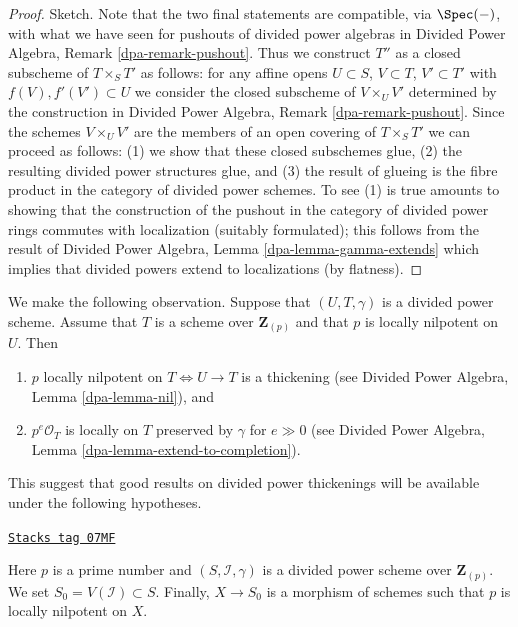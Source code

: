 \begin{proof}
Sketch. Note that the two final statements are compatible, via $\Spec(-)$,
with what we have seen for pushouts of divided power algebras in
Divided Power Algebra, Remark \ref{dpa-remark-pushout}.
Thus we construct $T''$ as a closed subscheme of $T \times_S T'$
as follows: for any affine opens $U \subset S$, $V \subset T$,
$V' \subset T'$ with $f(V), f'(V') \subset U$ we consider the closed
subscheme of $V \times_U V'$ determined by the construction in
Divided Power Algebra, Remark \ref{dpa-remark-pushout}. Since the
schemes $V \times_U V'$ are the members of an open covering
of $T \times_S T'$ we can proceed as follows: (1) we show that these
closed subschemes glue, (2) the resulting
divided power structures glue, and (3) the result of glueing
is the fibre product in the category of divided power schemes.
To see (1) is true amounts to showing
that the construction of the pushout in the category of
divided power rings commutes with localization (suitably
formulated); this follows from the result of
Divided Power Algebra, Lemma \ref{dpa-lemma-gamma-extends} which implies
that divided powers extend to localizations (by flatness).
\end{proof}

We make the following observation. Suppose that $(U, T, \gamma)$
is a divided power scheme. Assume that $T$ is a scheme over $\mathbf{Z}_{(p)}$
and that $p$ is locally nilpotent on $U$. Then
\begin{enumerate}
\item $p$ locally nilpotent on $T \Leftrightarrow U \to T$
is a thickening (see Divided Power Algebra, Lemma \ref{dpa-lemma-nil}), and
\item $p^e\mathcal{O}_T$ is locally on $T$ preserved by $\gamma$
for $e \gg 0$ (see
Divided Power Algebra, Lemma \ref{dpa-lemma-extend-to-completion}).
\end{enumerate}
This suggest that good results on divided power thickenings will be
available under the following hypotheses.

\begin{definition}
\label{crystalline-situation-global}
\href{https://stacks.math.columbia.edu/tag/07MF}{\texttt{Stacks tag 07MF}}

Here $p$ is a prime number and $(S, \mathcal{I}, \gamma)$ is a divided power
scheme over $\mathbf{Z}_{(p)}$. We set $S_0 = V(\mathcal{I}) \subset S$.
Finally, $X \to S_0$ is a morphism of schemes such that $p$ is
locally nilpotent on $X$.
\end{definition}

